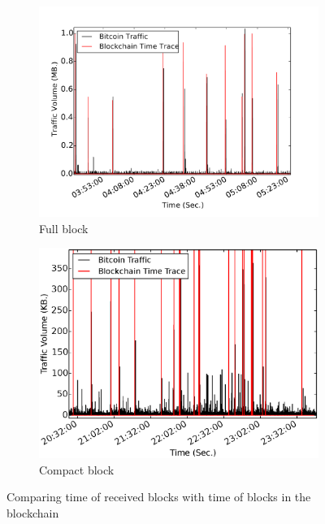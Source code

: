  \begin{figure}[!t]
\begin{subfigure}{.48\linewidth}
\centering
\includegraphics[width=\linewidth]{image/bitcoin_traffic_pattern.pdf}
\caption{Full block}
\label{fig:bitcoin_traffic_pattern}
\end{subfigure}
\centering
\begin{subfigure}{.48\linewidth}
\includegraphics[width=\linewidth]{image/cmpctblock_traffic_volume_good.eps}
\caption{Compact block}
\label{fig:cmpctblock_traffic_volume_detectable}
\end{subfigure}
\caption{Comparing time of received blocks with time of blocks in the blockchain}
\end{figure}

